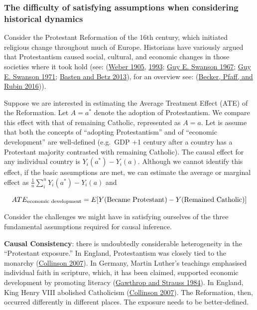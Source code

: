\documentclass[
  singlecolumn]{article}
\begin{document}
\hypertarget{the-difficulty-of-satisfying-assumptions-when-considering-historical-dynamics}{%
\subsubsection{The difficulty of satisfying assumptions when considering
historical
dynamics}\label{the-difficulty-of-satisfying-assumptions-when-considering-historical-dynamics}}

Consider the Protestant Reformation of the 16th century, which initiated
religious change throughout much of Europe. Historians have variously
argued that Protestantism caused social, cultural, and economic changes
in those societies where it took hold (see:
(\protect\hyperlink{ref-weber1905}{Weber 1905},
\protect\hyperlink{ref-weber1993}{1993};
\protect\hyperlink{ref-swanson1967}{Guy E. Swanson 1967};
\protect\hyperlink{ref-swanson1971}{Guy E. Swanson 1971};
\protect\hyperlink{ref-basten2013}{Basten and Betz 2013}), for an
overview see: (\protect\hyperlink{ref-becker2016}{Becker, Pfaff, and
Rubin 2016})).

Suppose we are interested in estimating the Average Treatment Effect
(ATE) of the Reformation. Let \(A = a^*\) denote the adoption of
Protestantism. We compare this effect with that of remaining Catholic,
represented as \(A = a\). Let is assume that both the concepts of
``adopting Protestantism'' and of ``economic development'' are
well-defined (e.g.~GDP +1 century after a country has a Protestant
majority contrasted with remaining Catholic). The causal effect for any
individual country is \(Y_i(a^*) - Y_i(a)\). Although we cannot identify
this effect, if the basic assumptions are met, we can estimate the
average or marginal effect as
\(\frac{1}{n} \sum_i^{n} Y_i(a^*) - Y_i(a)\) and

\[ATE_{\textnormal{economic~development}} = E[Y(\textnormal{Became~Protestant}) - Y(\textnormal{Remained~Catholic})]\]

Consider the challenges we might have in satisfying ourselves of the
three fundamental assumptions required for causal inference.

\textbf{Causal Consistency}: there is undoubtedly considerable
heterogeneity in the ``Protestant exposure.'' In England, Protestantism
was closely tied to the monarchy
(\protect\hyperlink{ref-collinson2007}{Collinson 2007}). In Germany,
Martin Luther's teachings emphasised individual faith in scripture,
which, it has been claimed, supported economic development by promoting
literacy (\protect\hyperlink{ref-gawthrop1984}{Gawthrop and Strauss
1984}). In England, King Henry VIII abolished Catholicism
(\protect\hyperlink{ref-collinson2007}{Collinson 2007}). The
Reformation, then, occurred differently in different places. The
exposure needs to be better-defined.
\end{document}
